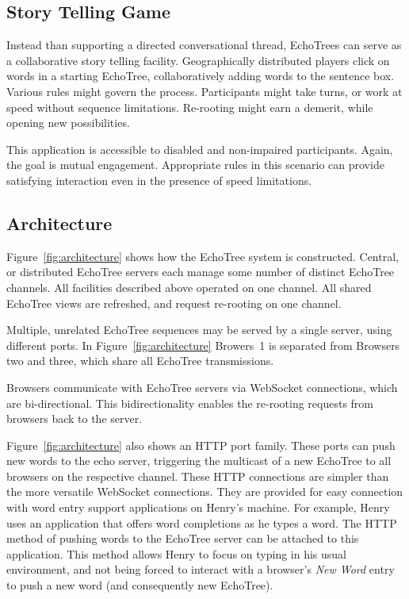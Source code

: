 \documentclass{sigchi}
\begin{document}
\subsection{Story Telling Game}

Instead than supporting a directed conversational thread,
EchoTrees can serve as a collaborative story telling
facility. Geographically distributed players click on words in a
starting EchoTree, collaboratively adding words to the sentence
box. Various rules might govern the process. Participants might take
turns, or work at speed without sequence limitations. Re-rooting might
earn a demerit, while opening new possibilities. 

This application is accessible to disabled and non-impaired
participants. Again, the goal is mutual engagement. Appropriate rules
in this scenario can provide satisfying interaction even in the
presence of speed limitations.

\subsection{Architecture}

Figure~\ref{fig:architecture} shows how the EchoTree system is
constructed. Central, or distributed EchoTree servers each manage some
number of distinct EchoTree channels. All facilities described above
operated on one channel. All shared EchoTree views are refreshed, and
request re-rooting on one channel. 

Multiple, unrelated EchoTree sequences may be served by a single
server, using different ports. In Figure~\ref{fig:architecture}
Browers~1 is separated from Browsers two and three, which share all
EchoTree transmissions.

Browsers communicate with EchoTree servers via WebSocket connections,
which are bi-directional. This bidirectionality enables the re-rooting
requests from browsers back to the server.

Figure~\ref{fig:architecture} also shows an HTTP port family. These
ports can push new words to the echo server, triggering the multicast
of a new EchoTree to all browsers on the respective channel. These
HTTP connections are simpler than the more versatile WebSocket
connections. They are provided for easy connection with word entry
support applications on Henry's machine. For example, Henry uses an
application that offers word completions as he types a word. The HTTP
method of pushing words to the EchoTree server can be attached to this
application. This method allows Henry to focus on typing in his usual
environment, and not being forced to interact with a browser's {\em
  New Word} entry to push a new word (and consequently new EchoTree).
\end{document}

